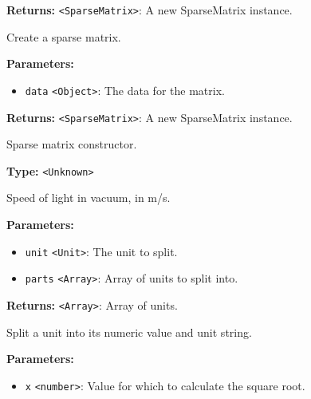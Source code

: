 \documentclass[12pt,a4paper]{article}
\begin{document}
\noindent \textbf{Returns:} \texttt{<SparseMatrix>}: A new SparseMatrix instance.

\noindent Create a sparse matrix.

\vspace{5mm}
\noindent {}


\noindent \textbf{Parameters:}
\begin{itemize}
  \item \texttt{data} \texttt{<Object>}: The data for the matrix.
\end{itemize}

\noindent \textbf{Returns:} \texttt{<SparseMatrix>}: A new SparseMatrix instance.

\noindent Sparse matrix constructor.

\vspace{5mm}
\noindent {}\vspace{4mm}


\noindent \textbf{Type:} \texttt{<Unknown>}

\noindent Speed of light in vacuum, in m/s.

\vspace{5mm}
\noindent {}


\noindent \textbf{Parameters:}
\begin{itemize}
  \item \texttt{unit} \texttt{<Unit>}: The unit to split.
  \item \texttt{parts} \texttt{<Array>}: Array of units to split into.
\end{itemize}

\noindent \textbf{Returns:} \texttt{<Array>}: Array of units.

\noindent Split a unit into its numeric value and unit string.

\vspace{5mm}
\noindent {}


\noindent \textbf{Parameters:}
\begin{itemize}
  \item \texttt{x} \texttt{<number>}: Value for which to calculate the square root.
\end{itemize}
\end{document}
